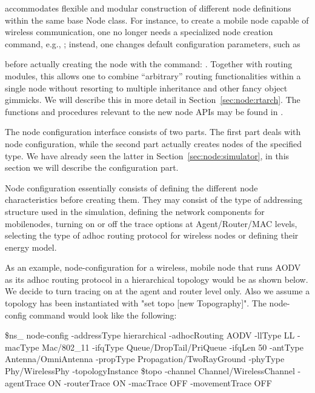  accommodates flexible and modular
construction of different node definitions within the same base Node
class.
For instance, to create a mobile node capable
of wireless communication, one no longer needs a specialized node
creation command, e.g., ; instead, one
changes default configuration parameters, such as  
before actually 
creating the node with the command: .
Together with routing modules, this allows
one to combine ``arbitrary'' routing functionalities within a single
node without resorting to multiple inheritance and other fancy object
gimmicks. 
We will describe this in more detail in Section~\ref{sec:node:rtarch}.
The functions and procedures relevant to the new node APIs may be
found in .

The node configuration interface consists of two parts. 
The first part deals with node configuration, while the second part
actually creates nodes of the specified type. 
We have already seen the latter in Section~\ref{sec:node:simulator},
in this section we will describe the configuration part. 

Node configuration essentially consists of defining the different node
characteristics before creating them. They may consist of the type of
addressing structure used in the simulation, defining the network
components for mobilenodes, turning on or off the trace options at
Agent/Router/MAC levels, selecting the type of adhoc routing protocol for
wireless nodes or defining their energy model.

As an example, node-configuration for a wireless, mobile node that 
runs AODV as its
adhoc routing protocol in a hierarchical topology would be as shown below.
We decide to turn tracing on at the agent and router level only. Also we 
assume a topology has been instantiated with "set topo [new Topography]". 
The node-config command would look like the following:

\begin{program}
  \$ns_ node-config -addressType hierarchical \bs 
                   -adhocRouting AODV \bs
                   -llType LL \bs
                   -macType Mac/802_11 \bs 
                   -ifqType Queue/DropTail/PriQueue \bs
                   -ifqLen 50 \bs
                   -antType Antenna/OmniAntenna \bs 
                   -propType Propagation/TwoRayGround \bs
                   -phyType Phy/WirelessPhy \bs
                   -topologyInstance \$topo \bs
                   -channel Channel/WirelessChannel \bs 
                   -agentTrace ON \bs 
                   -routerTrace ON \bs
                   -macTrace OFF \bs
                   -movementTrace OFF 
\end{program}

